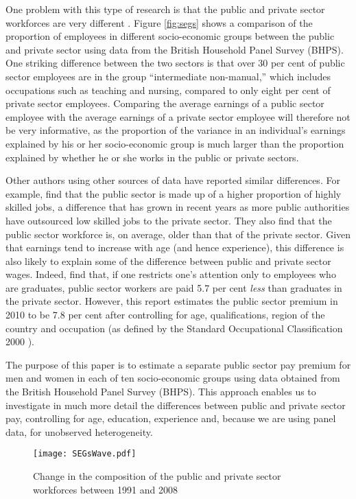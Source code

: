 \documentclass[a4paper,11pt,titlepage]{article}
\begin{document}
 One problem with this type of research is that the public and private sector workforces are very different \citep{IDS2011}.  Figure \ref{fig:segs} shows a comparison of the proportion of employees in different socio-economic groups between the public and private sector using data from the British Household Panel Survey (BHPS).  One striking difference between the two sectors is that over 30 per cent of public sector employees are in the group ``intermediate non-manual,'' which includes occupations such as teaching and nursing, compared to only eight per cent of private sector employees.  Comparing the average earnings of a public sector employee with the average earnings of a private sector employee will therefore not be very informative, as the proportion of the variance in an individual's earnings explained by his or her socio-economic group is much larger than the proportion explained by whether he or she works in the public or private sectors.

 Other authors using other sources of data have reported similar differences.  For example, \citet{Damant2011}
 find that the public sector is made up of a higher proportion of highly skilled jobs, a difference that has grown in recent years as more public authorities have outsourced low skilled jobs to the private sector.  They also find that the public sector workforce is, on average, older than that of the private sector.  Given that earnings tend to increase with age (and hence experience), this difference is also likely to explain some of the difference between public and private sector wages.  Indeed, \citet{Damant2011} find that, if one restricts one's attention only to employees who are graduates, public sector workers are paid 5.7 per cent \emph{less} than graduates in the private sector.  However, this report estimates the public sector premium in 2010 to be 7.8 per cent after controlling for age, qualifications, region of the country and occupation (as defined by the Standard Occupational Classification 2000 \citep{SOC2000}).

 The purpose of this paper is to estimate a separate public sector pay premium for men and women in each of ten socio-economic groups using data obtained from the British Household Panel Survey (BHPS).  This approach enables us to investigate in much more detail the differences between public and private sector pay, controlling for age, education, experience and, because we are using panel data, for unobserved heterogeneity.

\begin{figure}[htb]
    \centering
    \texttt{[image: SEGsWave.pdf]}
    \caption{Change in the composition of the public and private sector workforces between 1991 and 2008\label{fig:change}}
\end{figure}
\end{document}

